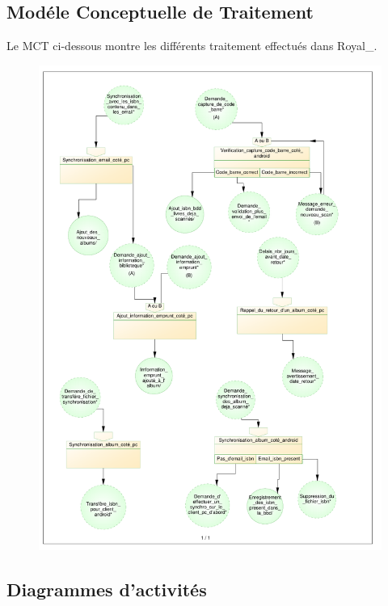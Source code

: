 \subsection{Modéle Conceptuelle de Traitement}

Le MCT ci-dessous montre les différents traitement effectués dans Royal\_. 

\begin{figure}
\includegraphics[width=16cm]{MCT_Royal.pdf}
\end{figure}
\clearpage{}

\subsection{Diagrammes d'activités}

